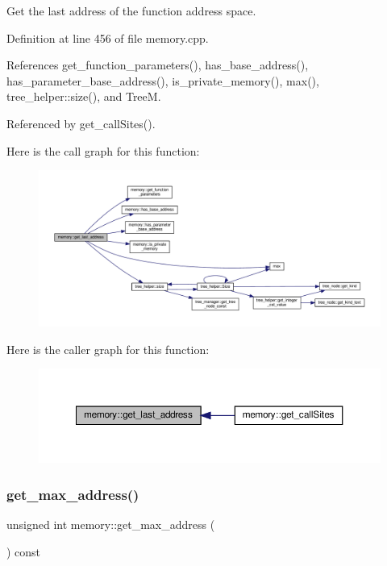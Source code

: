 Get the last address of the function address space. 



Definition at line 456 of file memory.\+cpp.



References get\+\_\+function\+\_\+parameters(), has\+\_\+base\+\_\+address(), has\+\_\+parameter\+\_\+base\+\_\+address(), is\+\_\+private\+\_\+memory(), max(), tree\+\_\+helper\+::size(), and TreeM.



Referenced by get\+\_\+call\+Sites().

Here is the call graph for this function\+:
\nopagebreak
\begin{figure}[H]
\begin{center}
\leavevmode
\includegraphics[width=350pt]{d8/d99/classmemory_a7fa2c69835e5b2deefc2b380f710b470_cgraph}
\end{center}
\end{figure}
Here is the caller graph for this function\+:
\nopagebreak
\begin{figure}[H]
\begin{center}
\leavevmode
\includegraphics[width=350pt]{d8/d99/classmemory_a7fa2c69835e5b2deefc2b380f710b470_icgraph}
\end{center}
\end{figure}
\mbox{\label{classmemory_ae371f1c8d9b33b71254ecb705d7ff51d}} 
\subsubsection{\texorpdfstring{get\+\_\+max\+\_\+address()}{get\_max\_address()}}
{\footnotesize\ttfamily unsigned int memory\+::get\+\_\+max\+\_\+address (\begin{DoxyParamCaption}{ }\end{DoxyParamCaption}) const}



